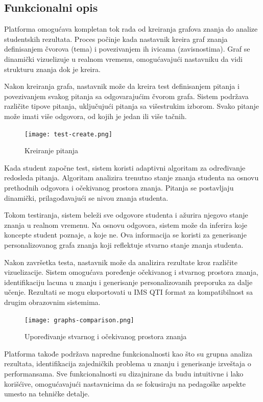 \documentclass[conference]{IEEEtran}
\begin{document}
\subsection{Funkcionalni opis}

Platforma omogućava kompletan tok rada od kreiranja grafova znanja do analize studentskih rezultata. Proces počinje kada nastavnik kreira graf znanja definisanjem čvorova (tema) i povezivanjem ih ivicama (zavisnostima). Graf se dinamički vizuelizuje u realnom vremenu, omogućavajući nastavniku da vidi strukturu znanja dok je kreira.

Nakon kreiranja grafa, nastavnik može da kreira test definisanjem pitanja i povezivanjem svakog pitanja sa odgovarajućim čvorom grafa. Sistem podržava različite tipove pitanja, uključujući pitanja sa višestrukim izborom. Svako pitanje može imati više odgovora, od kojih je jedan ili više tačnih.

\begin{figure}[H]
\centering
\texttt{[image: test-create.png]}
\caption{Kreiranje pitanja}
\end{figure}

Kada student započne test, sistem koristi adaptivni algoritam za određivanje redosleda pitanja. Algoritam analizira trenutno stanje znanja studenta na osnovu prethodnih odgovora i očekivanog prostora znanja. Pitanja se postavljaju dinamički, prilagođavajući se nivou znanja studenta.

Tokom testiranja, sistem beleži sve odgovore studenta i ažurira njegovo stanje znanja u realnom vremenu. Na osnovu odgovora, sistem može da inferira koje koncepte student poznaje, a koje ne. Ova informacija se koristi za generisanje personalizovanog grafa znanja koji reflektuje stvarno stanje znanja studenta.

Nakon završetka testa, nastavnik može da analizira rezultate kroz različite vizuelizacije. Sistem omogućava poređenje očekivanog i stvarnog prostora znanja, identifikaciju lacuna u znanju i generisanje personalizovanih preporuka za dalje učenje. Rezultati se mogu eksportovati u IMS QTI format za kompatibilnost sa drugim obrazovnim sistemima.

\begin{figure}[H]
\centering
\texttt{[image: graphs-comparison.png]}
\caption{Upoređivanje stvarnog i očekivanog prostora znanja}
\end{figure}

Platforma takođe podržava napredne funkcionalnosti kao što su grupna analiza rezultata, identifikacija zajedničkih problema u znanju i generisanje izveštaja o performansama. Sve funkcionalnosti su dizajnirane da budu intuitivne i lako korišćive, omogućavajući nastavnicima da se fokusiraju na pedagoške aspekte umesto na tehničke detalje.
\end{document}
